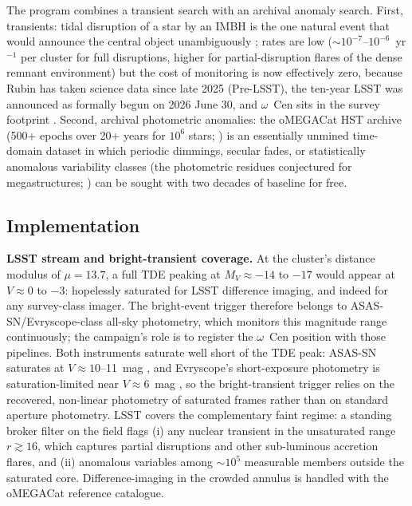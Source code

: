 \documentclass[11pt]{article}
\newcommand{\ocen}{\ensuremath{\omega}~Cen}
\begin{document}
The program combines a transient search with an archival anomaly search. First, transients: tidal disruption of a star by an IMBH is the one natural event that would announce the central object unambiguously \citep{Hills1988,Gezari2021}; rates are low ($\sim 10^{-7}$--$10^{-6}$~yr$^{-1}$ per cluster for full disruptions, higher for partial-disruption flares of the dense remnant environment) but the cost of monitoring is now effectively zero, because Rubin has taken science data since late 2025 (Pre-LSST), the ten-year LSST was announced as formally begun on 2026 June 30, and \ocen{} sits in the survey footprint \citep{Ivezic2019,RubinLSSTStart2026}. Second, archival photometric anomalies: the oMEGACat HST archive (500+ epochs over 20+ years for $10^{6}$ stars; \citealt{Haberle2024oMEGACatII,Nitschai2023}) is an essentially unmined time-domain dataset in which periodic dimmings, secular fades, or statistically anomalous variability classes (the photometric residues conjectured for megastructures; \citealt{Wright2014,Hsiao2021,SocasNavarro2021}) can be sought with two decades of baseline for free.

\subsection{Implementation}

\textbf{LSST stream and bright-transient coverage.} At the cluster's distance modulus of $\mu = 13.7$, a full TDE peaking at $M_V \approx -14$ to $-17$ would appear at $V \approx 0$ to $-3$: hopelessly saturated for LSST difference imaging, and indeed for any survey-class imager. The bright-event trigger therefore belongs to ASAS-SN/Evryscope-class all-sky photometry, which monitors this magnitude range continuously; the campaign's role is to register the \ocen{} position with those pipelines. Both instruments saturate well short of the TDE peak: ASAS-SN saturates at $V \approx 10$--11~mag \citep{Kochanek2017}, and Evryscope's short-exposure photometry is saturation-limited near $V \approx 6$~mag \citep{Law2015}, so the bright-transient trigger relies on the recovered, non-linear photometry of saturated frames rather than on standard aperture photometry. LSST covers the complementary faint regime: a standing broker filter on the field flags (i) any nuclear transient in the unsaturated range $r \gtrsim 16$, which captures partial disruptions and other sub-luminous accretion flares, and (ii) anomalous variables among $\sim10^{5}$ measurable members outside the saturated core. Difference-imaging in the crowded annulus is handled with the oMEGACat reference catalogue.
\end{document}
